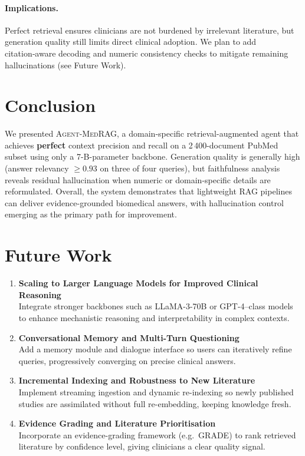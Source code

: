 \documentclass[conference]{IEEEtran}
\begin{document}
\paragraph{Implications.}
Perfect retrieval ensures clinicians are not burdened by irrelevant literature, but generation quality still limits direct clinical adoption.  
We plan to add citation‑aware decoding and numeric consistency checks to mitigate remaining hallucinations (see Future Work).

\section{Conclusion}

We presented \textsc{Agent-MedRAG}, a domain-specific retrieval-augmented
agent that achieves \textbf{perfect} context precision and recall on a
2\,400-document PubMed subset using only a 7-B-parameter backbone.  Generation
quality is generally high (answer relevancy $\ge0.93$ on three of four queries),
but faithfulness analysis reveals residual hallucination when numeric or
domain-specific details are reformulated.  Overall, the system demonstrates
that lightweight RAG pipelines can deliver evidence-grounded biomedical answers,
with hallucination control emerging as the primary path for improvement.

\section{Future Work}
\begin{enumerate}[leftmargin=*]
  \item \textbf{Scaling to Larger Language Models for Improved Clinical Reasoning}\\
        Integrate stronger backbones such as LLaMA-3-70B or GPT-4–class models to
        enhance mechanistic reasoning and interpretability in complex contexts.

  \item \textbf{Conversational Memory and Multi-Turn Questioning}\\
        Add a memory module and dialogue interface so users can iteratively
        refine queries, progressively converging on precise clinical answers.

  \item \textbf{Incremental Indexing and Robustness to New Literature}\\
        Implement streaming ingestion and dynamic re-indexing so newly published
        studies are assimilated without full re-embedding, keeping knowledge fresh.

  \item \textbf{Evidence Grading and Literature Prioritisation}\\
        Incorporate an evidence-grading framework (e.g.\ GRADE) to rank
        retrieved literature by confidence level, giving clinicians a clear
        quality signal.
\end{enumerate}



\end{document}
